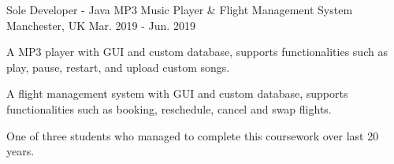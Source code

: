 \begin{cventries}
\cventry
  {Sole Developer - Java} %
  {MP3 Music Player \& Flight Management System} %
  {Manchester, UK} %
  {Mar. 2019 - Jun. 2019} %
  {
    \begin{cvitems} %
      \item {A MP3 player with GUI and custom database, supports functionalities such as play, pause, restart, and upload custom songs.}
      \item {A flight management system with GUI and custom database, supports functionalities such as booking, reschedule, cancel and swap flights.}
      \item {One of three students who managed to complete this coursework over last 20 years.}
    \end{cvitems}
  }
    
    



\end{cventries}
